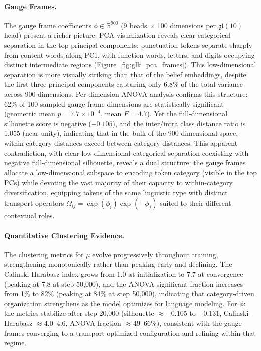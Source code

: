 \documentclass[twoside,11pt]{article}
\begin{document}
\paragraph{Gauge Frames.} The gauge frame coefficients $\phi \in \mathbb{R}^{900}$ (9 heads $\times$ 100 dimensions per $\mathfrak{gl}(10)$ head) present a richer picture. PCA visualization reveals clear categorical separation in the top principal components: punctuation tokens separate sharply from content words along PC1, with function words, letters, and digits occupying distinct intermediate regions (Figure~\ref{fig:glk_pca_frames}). This low-dimensional separation is more visually striking than that of the belief embeddings, despite the first three principal components capturing only 6.8\% of the total variance across 900 dimensions. Per-dimension ANOVA analysis confirms this structure: 62\% of 100 sampled gauge frame dimensions are statistically significant (geometric mean $p = 7.7 \times 10^{-4}$, mean $F = 4.7$). Yet the full-dimensional silhouette score is negative ($-0.105$), and the inter/intra class distance ratio is 1.055 (near unity), indicating that in the bulk of the 900-dimensional space, within-category distances exceed between-category distances. This apparent contradiction, with clear low-dimensional categorical separation coexisting with negative full-dimensional silhouette, reveals a dual structure: the gauge frames allocate a low-dimensional subspace to encoding token category (visible in the top PCs) while devoting the vast majority of their capacity to within-category diversification, equipping tokens of the same linguistic type with distinct transport operators $\Omega_{ij} = \exp(\phi_i)\exp(-\phi_j)$ suited to their different contextual roles.

\paragraph{Quantitative Clustering Evidence.} The clustering metrics for $\mu$ evolve progressively throughout training, strengthening monotonically rather than peaking early and declining. The Calinski-Harabasz index grows from 1.0 at initialization to 7.7 at convergence (peaking at 7.8 at step 50{,}000), and the ANOVA-significant fraction increases from 1\% to 82\% (peaking at 84\% at step 50{,}000), indicating that category-driven organization strengthens as the model optimizes for language modeling. For $\phi$: the metrics stabilize after step 20{,}000 (silhouette $\approx -0.105$ to $-0.131$, Calinski-Harabasz $\approx 4.0$--$4.6$, ANOVA fraction $\approx 49$--$66\%$), consistent with the gauge frames converging to a transport-optimized configuration and refining within that regime.
\end{document}
